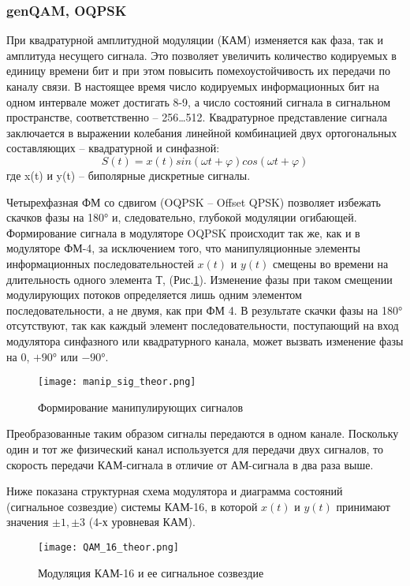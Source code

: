 \subsubsection{genQAM, OQPSK}
При квадратурной амплитудной модуляции (КАМ) изменяется как фаза, так и амплитуда несущего сигнала. Это позволяет увеличить количество кодируемых в единицу времени бит и при этом повысить помехоустойчивость их передачи по каналу связи. В настоящее время число кодируемых информационных бит на одном интервале может достигать 8-9, а число состояний сигнала в сигнальном пространстве, соответственно – 256…512.
Квадратурное представление сигнала заключается в выражении колебания линейной комбинацией двух ортогональных составляющих – квадратурной и синфазной:
\begin{equation}
	S(t) = x(t) sin(\omega t + \varphi) cos(\omega t + \varphi)
\end{equation}
где x(t) и y(t) – биполярные дискретные сигналы.

Четырехфазная ФМ со сдвигом (OQPSK – Offset QPSK) позволяет избежать скачков фазы на 180° и, следовательно, глубокой модуляции огибающей. Формирование сигнала в модуляторе OQPSK происходит так же, как и в модуляторе ФМ-4, за исключением того, что манипуляционные элементы информационных последовательностей $x(t)$ и $y(t)$ смещены во времени на длительность одного элемента $Т$, (Рис.\ref{manip_sig_theor}). Изменение фазы при таком смещении модулирующих потоков определяется лишь одним элементом последовательности, а не двумя, как при ФМ 4. В результате скачки фазы на 180° отсутствуют, так как каждый элемент последовательности, поступающий на вход модулятора синфазного или квадратурного канала, может вызвать изменение фазы на $0$, $+90°$ или $-90°$.
\begin{figure}[H]
	\begin{center}
		\texttt{[image: manip\_sig\_theor.png]}
		\caption{Формирование манипулирующих сигналов} %
		\label{manip_sig_theor} %
	\end{center}
\end{figure} 
Преобразованные таким образом сигналы передаются в одном канале. Поскольку один и тот же физический канал используется для передачи двух сигналов, то скорость передачи КАМ-сигнала в отличие от АМ-сигнала в два раза выше.

Ниже показана структурная схема модулятора и диаграмма состояний (сигнальное созвездие) системы КАМ-16, в которой $x(t)$ и $y(t)$ принимают значения $\pm 1, \pm 3$ (4-х уровневая КАМ). 
\begin{figure}[H]
	\begin{center}
		\texttt{[image: QAM\_16\_theor.png]}
		\caption{Модуляция КАМ-16 и ее сигнальное созвездие} %
		\label{QAM_16_theor} %
	\end{center}
\end{figure} 

